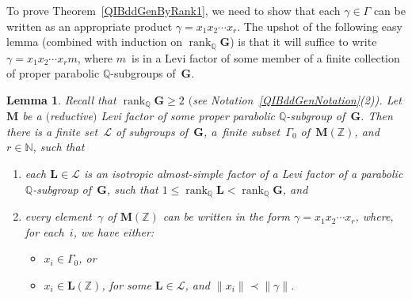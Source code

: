 \documentclass[11pt]{article}
\numberwithin{equation}{section}
\newcommand{\NN}{\mathbb{N}}
\newcommand{\QQ}{\mathbb{Q}}
\newcommand{\ZZ}{\mathbb{Z}}
\newcommand{\Ga}{\mathbf{G}}
\newcommand{\La}{\mathbf{L}}
\newcommand{\Ma}{\mathbf{M}}
\DeclareMathOperator{\rank}{rank}
\newcommand{\subgroups}{\mathcal{L}}
\numberwithin{equation}{section}
\newtheorem{lem}[thm]{Lemma}
\theoremstyle{definition}
\begin{document}
To prove Theorem~\ref{QIBddGenByRank1}, we need to show that each $\gamma \in \Gamma$ can be written as an appropriate product $\gamma = x_1x_2\cdots x_r$. The upshot of the following easy lemma (combined with induction on $\rank_\QQ \Ga$) is that it will suffice to write $\gamma = x_1x_2\cdots x_r m$, where $m$~is in a Levi factor of some member of a finite collection of proper parabolic $\QQ$-subgroups of~$\Ga$.

\begin{lem} \label{LeviOK}
Recall that $\rank_\QQ \Ga \ge 2$ $($see Notation~{\rm \ref{QIBddGenNotation}(2))}.
Let $\Ma$ be a $($reductive$)$ Levi factor of some proper parabolic $\QQ$-subgroup of~$\Ga$. Then there is a finite set~$\subgroups$ of subgroups of~$\Ga$, a~finite subset~$\Gamma_0$ of~$\Ma(\ZZ)$, and $r \in \NN$, such that
\begin{enumerate}\itemsep=0pt
\item[$1)$] each $\La \in \subgroups$ is an isotropic almost-simple factor of a Levi factor of a parabolic $\QQ$-subgroup of~$\Ga$, such that $1 \le \rank_\QQ \La < \rank_\QQ \Ga$, and
\item[$2)$] every element~$\gamma$ of $\Ma(\ZZ)$ can be written in the form $\gamma = x_1 x_2 \cdots x_r$, where, for each~$i$, we have either:
\begin{itemize}\itemsep=0pt
\item $x_i \in \Gamma_0$, or
\item $x_i \in \La(\ZZ)$, for some $\La \in \subgroups$, and $\|x_i\| \prec \|\gamma\|$.
\end{itemize}
\end{enumerate}
\end{lem}
\end{document}
